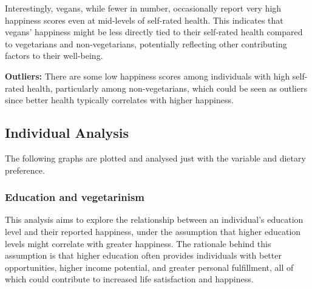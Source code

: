\documentclass[
]{article}
\begin{document}
Interestingly, vegans, while fewer in number, occasionally report very
high happiness scores even at mid-levels of self-rated health. This
indicates that vegans' happiness might be less directly tied to their
self-rated health compared to vegetarians and non-vegetarians,
potentially reflecting other contributing factors to their well-being.

\textbf{Outliers:} There are some low happiness scores among individuals
with high self-rated health, particularly among non-vegetarians, which
could be seen as outliers since better health typically correlates with
higher happiness.

\subsection{Individual Analysis}\label{individual-analysis}

The following graphs are plotted and analysed just with the variable and
dietary preference.

\subsubsection{Education and
vegetarinism}\label{education-and-vegetarinism}

This analysis aims to explore the relationship between an individual's
education level and their reported happiness, under the assumption that
higher education levels might correlate with greater happiness. The
rationale behind this assumption is that higher education often provides
individuals with better opportunities, higher income potential, and
greater personal fulfillment, all of which could contribute to increased
life satisfaction and happiness.
\end{document}
